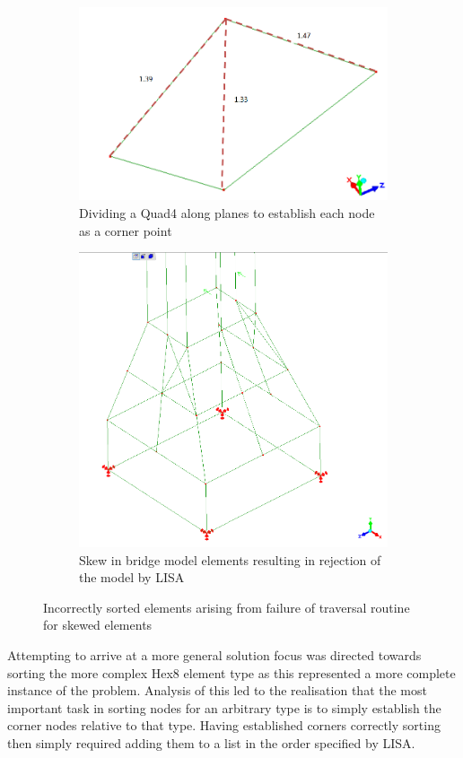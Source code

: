\begin{figure}[!h]
\centering
\begin{subfigure}{.5\textwidth}
  \centering
  \includegraphics[width=0.9\linewidth]{../Graphics/SkewedElementIssues.png}
  \caption{Dividing a Quad4 along planes to establish each node as a corner point}
  \label{fig:sub1}
\end{subfigure}%
\begin{subfigure}{.5\textwidth}
  \centering
  \includegraphics[width=0.7\linewidth]{../Graphics/ElementSkewOnBridge.png}
  \caption{Skew in bridge model elements resulting in rejection of the model by LISA}
  \label{fig:sub2}
\end{subfigure}
\caption{Incorrectly sorted elements arising from failure of traversal routine for skewed elements}
\label{fig:test}
\end{figure}



\noindent
Attempting to arrive at a more general solution focus was directed towards sorting the more complex Hex8 element type as this represented a more complete instance of the problem. Analysis of this led to the realisation that the most important task in sorting nodes for an arbitrary type is to simply establish the corner nodes relative to that type. Having established corners correctly sorting then simply required adding them to a list in the order specified by LISA. \\

